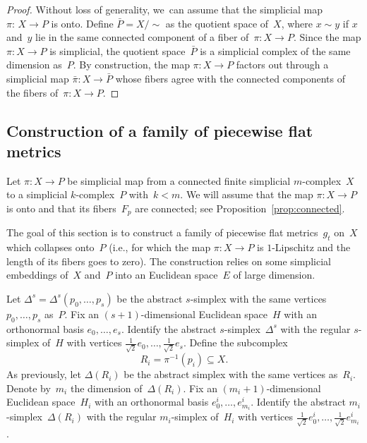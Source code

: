 \documentclass[11pt]{article}
\newcommand{\ie}{i.e.,\xspace}
\theoremstyle{definition}
\numberwithin{equation}{section}
\begin{document}
\begin{proof}
Without loss of generality, we~can assume that the simplicial map \hbox{$\pi{:}\,X\!\to\!P$} is onto.
Define $\bar{P} = X / \! \sim$ as the quotient space of~$X$, where $x \sim y$ if $x$ and~$y$ lie in the same connected component of a fiber of~$\pi:X \to P$.
Since the map $\pi:X \to P$ is simplicial, the quotient space~$\bar{P}$ is a simplicial complex of the same dimension as~$P$.
By construction, the map $\pi:X \to P$ factors out through a simplicial map $\bar{\pi}:X \to \bar{P}$ whose fibers agree with the connected components of the fibers of~$\pi:X \to P$.
\end{proof}

\subsection{Construction of a family of piecewise flat metrics} \label{sec:g_t}
Let $\pi:X \to P$ be simplicial map from a connected finite simplicial $m$\nobreakdash-complex~$X$ to a simplicial $k$\nobreakdash-com\-plex~$P$ with~$k<m$.
We will assume that the map $\pi:X \to P$ is onto and that its fibers~$F_p$ are connected; see Proposition~\ref{prop:connected}.

The goal of this section is to construct a family of piecewise flat metrics~$g_t$ on~$X$ which collapses onto~$P$ (\ie for which the map $\pi:X \to P$ is $1$-Lipschitz and the length of its fibers goes to zero).
The construction relies on some simplicial embeddings of~$X$ and~$P$ into an Euclidean space~$E$ of large dimension.

Let $\Delta^s=\Delta^s(p_0,\dots,p_s)$ be the abstract $s$-simplex with the same vertices $p_0,\dots,p_s$ as~$P$.
Fix an $(s+1)$-dimensional Euclidean space~$H$ with an orthonormal basis $e_0,\dots,e_s$.
Identify the abstract $s$-simplex~$\Delta^s$ with the regular $s$-simplex of~$H$ with vertices $\frac{1}{\sqrt{2}} e_0,\dots,\frac{1}{\sqrt{2}} e_s$.
Define the subcomplex
\[
R_i = \pi^{-1}(p_i) \subseteq X.
\]
As previously, let $\Delta(R_i)$ be the abstract simplex with the same vertices as~$R_i$.
Denote by~$m_i$ the dimension of~$\Delta(R_i)$.
Fix an $(m_i+1)$-dimensional Euclidean space~$H_i$ with an orthonormal basis $e_0^i,\dots,e_{m_i}^i$.
Identify the abstract $m_i$-simplex~$\Delta(R_i)$ with the regular $m_i$-simplex of~$H_i$ with vertices $\frac{1}{\sqrt{2}} e^i_0,\dots,\frac{1}{\sqrt{2}} e^i_{m_i}$.
\end{document}
